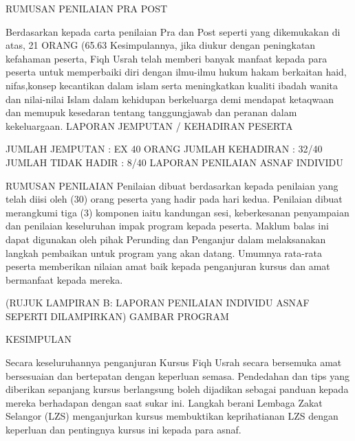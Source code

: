 RUMUSAN PENILAIAN PRA POST



Berdasarkan kepada carta penilaian Pra dan Post seperti yang dikemukakan di atas, 21 ORANG (65.63%
Kesimpulannya, jika diukur dengan peningkatan kefahaman peserta, Fiqh Usrah telah memberi banyak manfaat kepada para peserta untuk memperbaiki diri dengan ilmu-ilmu hukum hakam berkaitan haid, nifas,konsep kecantikan dalam islam serta meningkatkan kualiti ibadah wanita dan nilai-nilai Islam dalam kehidupan berkeluarga demi mendapat ketaqwaan dan memupuk kesedaran tentang tanggungjawab dan peranan dalam kekeluargaan.
LAPORAN JEMPUTAN / KEHADIRAN PESERTA














JUMLAH JEMPUTAN	: EX 40 ORANG JUMLAH KEHADIRAN	: 32/40 JUMLAH TIDAK HADIR	: 8/40
LAPORAN PENILAIAN ASNAF INDIVIDU

RUMUSAN PENILAIAN
Penilaian dibuat berdasarkan kepada penilaian yang telah diisi oleh (30) orang peserta yang hadir pada hari kedua. Penilaian dibuat merangkumi tiga (3) komponen iaitu kandungan sesi, keberkesanan penyampaian dan penilaian keseluruhan impak program kepada peserta. Maklum balas ini dapat digunakan oleh pihak Perunding dan Penganjur dalam melaksanakan langkah pembaikan untuk program yang akan datang. Umumnya rata-rata peserta memberikan nilaian amat baik kepada penganjuran kursus dan amat bermanfaat kepada mereka.

(RUJUK LAMPIRAN B: LAPORAN PENILAIAN INDIVIDU ASNAF SEPERTI DILAMPIRKAN)
GAMBAR PROGRAM







KESIMPULAN

Secara keseluruhannya penganjuran Kursus Fiqh Usrah secara bersemuka amat bersesuaian dan bertepatan dengan keperluan semasa. Pendedahan dan tips yang diberikan sepanjang kursus berlangsung boleh dijadikan sebagai panduan kepada mereka berhadapan dengan saat sukar ini. Langkah berani Lembaga Zakat Selangor (LZS) menganjurkan kursus membuktikan keprihatianan LZS dengan keperluan dan pentingnya kursus ini kepada para asnaf.



